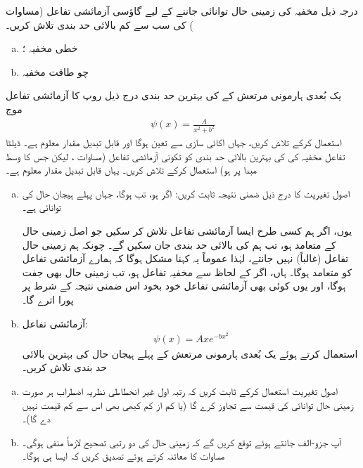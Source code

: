 درجہ ذیل مخفیہ کی زمینی حال توانائی جاننے کے لیے گاؤسی آزمائشی تفاعل (مساوات ) کی سب سے کم بالائی حد بندی تلاش کریں۔
\begin{enumerate}[a.]
\item
 خطی مخفیہ ؛
\item
 چو طاقت مخفیہ 
\end{enumerate}
 یک بُعدی ہارمونی مرتعش کے  کی بہترین حد بندی درج ذیل روپ کا آزمائشی تفاعل موج
\begin{align*}
\psi(x)=\frac{A}{x^{2}+b^{2}} 
\end{align*}
 استعمال کرکے تلاش کریں، جہاں  اکائی سازی سے تعین ہوگا اور  قابل تبدیل مقدار معلوم ہے۔
 ڈیلٹا تفاعل مخفیہ  کی  کی بہترین بالائی حد بندی کو تکونی آزمائشی تفاعل (مساوات ، لیکن جس کا وسط مبدا پر ہو) استعمال کرکے تلاش کریں۔ یہاں  قابل تبدیل مقدار معلوم ہے۔
\begin{enumerate}[a.]
\item
 اصول تغیریت کا درج ذیل ضمنی نتیجہ ثابت کریں: اگر  ہو، تب  ہوگا، جہاں پہلے ہیجان حال کی توانائی  ہے۔ 
 
 یوں، اگر ہم کسی طرح ایسا آزمائشی تفاعل تلاش کر سکیں جو اصل زمینی حال کے  متعامد ہو، تب ہم  کی بالائی حد بندی جان سکیں گے۔ چونکہ ہم زمینی حال تفاعل  (غالباً) نہیں جانتے، لہٰذا عموماً یہ کہنا مشکل ہوگا کہ  ہمارے آزمائشی تفاعل  کو متعامد ہوگا۔ ہاں، اگر  کے لحاظ سے مخفیہ   تفاعل ہو، تب زمینی حال بھی جفت ہوگا، اور یوں کوئی بھی  آزمائشی تفاعل خود بخود اس ضمنی نتیجہ کے شرط پر پورا اترے گا۔
 \item
 آزمائشی تفاعل:
\begin{align*}
\psi(x)=Axe^{-bx^{2}} 
\end{align*}
 استعمال کرتے ہوئے یک بُعدی ہارمونی مرتعش کے پہلے ہیجان حال کی بہترین بالائی حد بندی تلاش کریں۔
 \end{enumerate}
\begin{enumerate}[a.]
\item
 اصول تغیریت استعمال کرکے ثابت کریں کہ رتبہ اول غیر انحطاطی نظریہ اضطراب ہر صورت زمینی حال توانائی کی قیمت سے تجاوز کرے گا (یا کم از کم کبھی بھی اس سے کم قیمت نہیں دے گا)۔
 \item
 آپ جزو-الف جانتے ہوئے توقع کریں گے کہ زمینی حال کی دو رتبی تصحیح لازماً منفی ہوگی۔ مساوات  کا معائنہ کرتے ہوئے تصدیق کریں کہ ایسا ہی ہوگا۔
 \end{enumerate}


